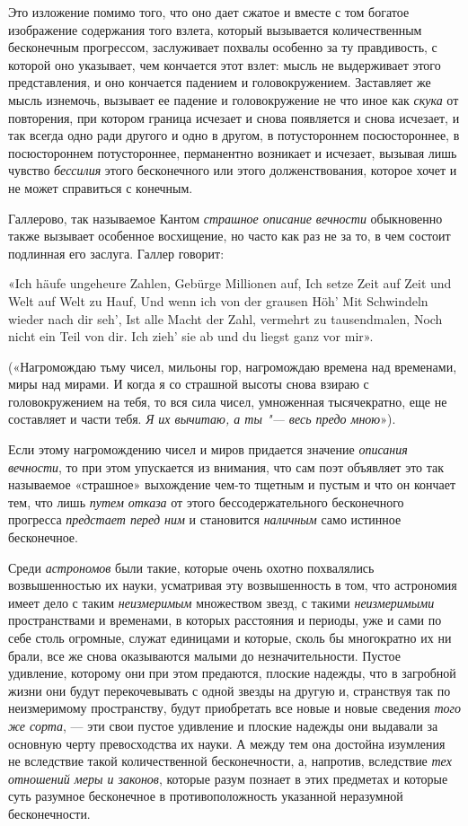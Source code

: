 {Это изложение помимо того, что оно дает сжатое и вместе с том богатое
изображение содержания того взлета, который вызывается количественным
бесконечным прогрессом, заслуживает похвалы особенно за ту правдивость, с
которой оно указывает, чем кончается этот взлет: мысль не выдерживает этого
представления, и оно кончается падением и головокружением. Заставляет же
мысль изнемочь, вызывает ее падение и головокружение не что иное как
{\em скука} от повторения, при котором граница исчезает
и снова появляется и снова исчезает, и так всегда одно ради другого и одно
в другом, в потустороннем посюстороннее, в посюстороннем потустороннее,
перманентно возникает и исчезает, вызывая лишь чувство
{\em бессилия} этого бесконечного или этого
долженствования, которое хочет и не может справиться с конечным.

Галлерово, так называемое Кантом {\em страшное описание
вечности} обыкновенно также вызывает особенное восхищение, но часто как раз
не за то, в чем состоит подлинная его заслуга.
Галлер говорит:

«Ich häufe ungeheure Zahlen,
Gebürge Millionen auf,
Ich setze Zeit auf Zeit und Welt auf Welt zu Hauf,
Und wenn ich von der grausen Höh'
Mit Schwindeln wieder nach dir seh',
Ist alle Macht der Zahl, vermehrt zu tausendmalen,
Noch nicht ein Teil von dir.
Ich zieh' sie ab und du liegst ganz vor mir».

(«Нагромождаю тьму чисел, мильоны гор, нагромождаю времена над временами,
миры над мирами. И когда я со страшной высоты снова взираю с
головокружением на тебя, то вся сила чисел, умноженная тысячекратно, еще не
составляет и части тебя. {\em Я их вычитаю, а ты "--- весь
предо мною}»).

Если этому нагромождению чисел и миров придается значение
{\em описания вечности}, то при этом упускается из
внимания, что сам поэт объявляет это так называемое «страшное» выхождение
чем-то тщетным и пустым и что он кончает тем, что лишь
{\em путем отказа} от этого бессодержательного
бесконечного прогресса {\em предстает перед ним} и
становится {\em наличным} само истинное бесконечное.

Среди {\em астрономов} были такие, которые очень охотно
похвалялись возвышенностью их науки, усматривая эту возвышенность в том,
что астрономия имеет дело с таким {\em неизмеримым}
множеством звезд, с такими {\em неизмеримыми}
пространствами и временами, в которых расстояния и периоды, уже и сами по
себе столь огромные, служат единицами и которые, сколь бы многократно их ни
брали, все же снова оказываются малыми до незначительности. Пустое
удивление, которому они при этом предаются, плоские надежды, что в
загробной жизни они будут перекочевывать с одной звезды на другую и,
странствуя так по неизмеримому пространству, будут приобретать все новые и
новые сведения {\em того же сорта}, — эти свои пустое
удивление и плоские надежды они выдавали за основную черту превосходства их
науки. А между тем она достойна изумления не вследствие такой
количественной бесконечности, а, напротив, вследствие
{\em тех отношений меры и законов}, которые разум
познает в этих предметах и которые суть разумное бесконечное в
противоположность указанной неразумной бесконечности.

}
